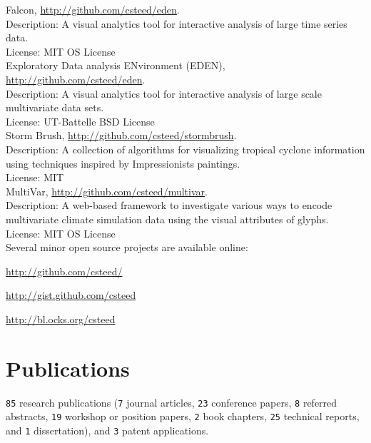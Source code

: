 \documentclass[11pt, letterpaper]{article}
\newcommand{\amper}{{\fontspec[Scale=.95]{Hoefler Text}\selectfont\itshape\&}}
\newcommand{\years}[1]{\marginnote{\scriptsize #1}}
\newenvironment{packed_itemize}{
\begin{itemize}
  \setlength{\itemsep}{1pt}
  \setlength{\parskip}{0pt}
  \setlength{\parsep}{0pt}
}{\end{itemize}}
\begin{document}
\years{2016}Falcon,
\href{http://github.com/csteed/eden}{http://github.com/csteed/eden}.\\
Description: A visual analytics tool for interactive analysis of large time series data.\\
License: MIT OS License\\
\years{2012-2016}Exploratory Data analysis ENvironment (EDEN),
\href{http://github.com/csteed/eden}{http://github.com/csteed/eden}.\\
Description: A visual analytics tool for interactive analysis of large scale multivariate
data sets.\\
License: UT-Battelle BSD License\\
\years{2015}Storm Brush,
\href{http://github.com/csteed/stormbrush}{http://github.com/csteed/stormbrush}.\\
Description: A collection of algorithms for visualizing tropical cyclone
information using techniques inspired by Impressionists paintings.\\
License: MIT\\
\years{2014}MultiVar,
\href{http://github.com/csteed/multivar}{http://github.com/csteed/multivar}.\\
Description: A web-based framework to investigate various ways to encode
multivariate climate simulation data using the visual attributes of glyphs.\\
License: MIT OS License\\

Several minor open source projects are available online:
\begin{packed_itemize}
\item \href{http://github.com/csteed/}{http://github.com/csteed/}
\item \href{http://gist.github.com/csteed}{http://gist.github.com/csteed}
\item \href{http://bl.ocks.org/csteed}{http://bl.ocks.org/csteed}
\end{packed_itemize}

\section*{Publications}
\texttt{85} research publications
(\texttt{7} journal articles,
\texttt{23} conference papers, \texttt{8} referred abstracts,
\texttt{19} workshop or position papers, \texttt{2} book
chapters, \texttt{25} technical reports, and \texttt{1} dissertation),
and \texttt{3} patent applications.
\end{document}
